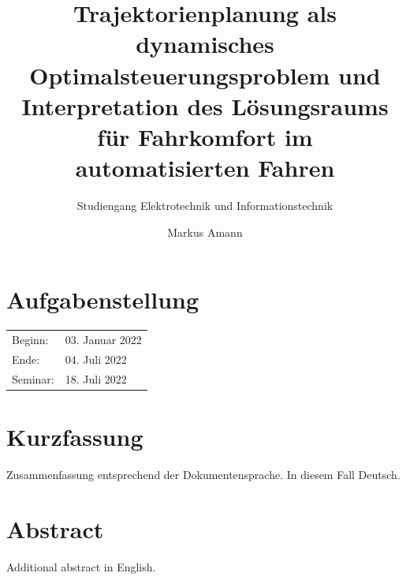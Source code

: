 
\title{Trajektorienplanung als dynamisches Optimalsteuerungsproblem und Interpretation des Lösungsraums für Fahrkomfort im automatisierten Fahren}
\subtitle{\textmd{Studiengang Elektrotechnik und Informationstechnik}}
\author[Markus Amann]{Markus Amann}




\lowertitleback{
	Technische Universität Darmstadt\\
	Institut für Automatisierungstechnik und Mechatronik\\
	Fachgebiet Regelungstechnik und Mechatronik\\
	Prof. Dr.-Ing. Ulrich Konigorski\\
}
\frontmatter
\maketitle

\clearpage
\setcounter{page}{1}
\section*{Aufgabenstellung}



\vspace{0.5cm}
\begin{tabular}{ll}
	Beginn: 	& 03. Januar 2022 \\
	Ende: 		& 04. Juli 2022 \\
	Seminar: 	& 18. Juli 2022 \\
\end{tabular}
\clearpage

\affidavit

\section*{Kurzfassung}
Zusammenfassung entsprechend der Dokumentensprache. In diesem Fall Deutsch.
\section*{Abstract}
Additional abstract in English.	
\cleardoublepage

\printglossary[type=main, title=Abkürzungsverzeichnis, toctitle=List of terms, nonumberlist]
\printglossaries
\cleardoublepage

\tableofcontents
\cleardoublepage

\mainmatter
